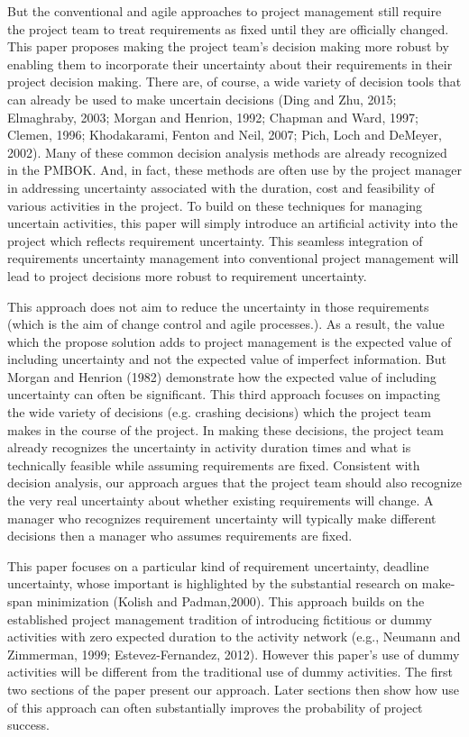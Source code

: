 \documentclass[11pt]{article}
\begin{document}
          \par
          But the conventional and agile approaches to project management still require the project team to treat requirements as fixed until they are officially changed.   This paper proposes making the project team's decision making more robust by enabling them to incorporate their uncertainty about their requirements in their project decision making.   There are, of course, a wide variety of decision tools that can already be used to make uncertain decisions  (Ding and Zhu, 2015; Elmaghraby, 2003; Morgan and Henrion, 1992;  Chapman and Ward, 1997; Clemen, 1996; Khodakarami, Fenton and Neil, 2007; Pich, Loch and DeMeyer, 2002).    
Many of these common decision analysis methods are already recognized in the PMBOK.  And, in fact, these methods are often use by the project manager in addressing uncertainty associated with the duration, cost and feasibility of various activities in the project.  To build on these techniques for managing uncertain activities, this paper will simply introduce an artificial activity into the project which reflects requirement uncertainty.  This seamless integration of requirements uncertainty management into conventional project management will lead to project decisions more robust to requirement uncertainty.
\par
This approach does not aim to reduce the uncertainty in those requirements (which is the aim of change control and agile processes.).  As a result, the value which the propose solution adds to project management is the expected value of including uncertainty and not the expected value of imperfect information.  But Morgan and Henrion (1982) demonstrate how the expected value of including uncertainty can often be significant.
          This third approach focuses on impacting the wide variety of decisions (e.g. crashing decisions) which the project team makes in the course of the project.   In making these decisions, the project team already recognizes the uncertainty in activity duration times and what is technically feasible while assuming requirements are fixed.  Consistent with decision analysis, our approach argues that the project team should also recognize the very real uncertainty about whether existing requirements will change.   A manager who recognizes requirement uncertainty will typically make different decisions then a manager who assumes requirements are fixed.  \par
            This paper focuses on a particular kind of requirement uncertainty, deadline uncertainty, whose important is highlighted by the substantial research on make-span minimization (Kolish and Padman,2000). This approach builds on the established project management tradition of introducing fictitious or dummy activities with zero expected duration to the activity network (e.g., Neumann and Zimmerman, 1999; Estevez-Fernandez, 2012). However this paper's use of dummy activities will be different from the traditional use of dummy activities.  The first two sections of the paper present our approach.  Later sections then show how use of this approach can often substantially improves the probability of project success.   \par
\end{document}
